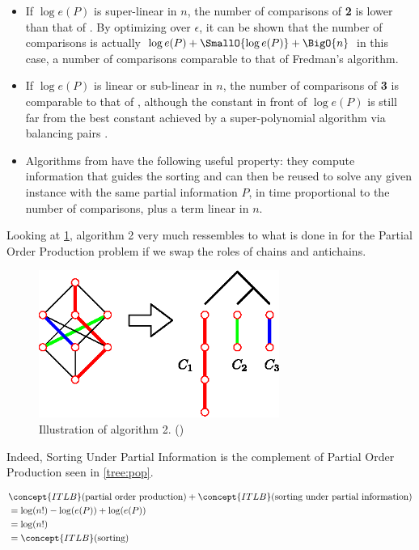 \begin{itemize}

\item If $\log e(P)$ is super-linear in $n$, the number of comparisons of \cite{cardinal2013sorting} \textbf{2} is lower than that of \cite{kahnkim1}. By optimizing over $\epsilon$, it can be shown that the number of comparisons is actually $\log e(P) + \SmallO{\log e(P)} + \BigO{n}$ in this case, a number of comparisons comparable to that of Fredman’s algorithm.

\item If $\log e(P)$ is linear or sub-linear in $n$, the number of comparisons of \cite{cardinal2013sorting} \textbf{3} is comparable to that of \cite{kahnkim1}, although the constant in front of $\log e(P)$ is still far from the best constant achieved by a super-polynomial algorithm via balancing pairs \cite{brightwell1995balancing, brightwell1999balanced}.

\item Algorithms from \cite{cardinal2013sorting} have the following useful property: they compute information that guides the sorting and can then be reused to solve any given instance with the same partial information $P$, in time proportional to the number of comparisons, plus a term linear in $n$.

\end{itemize}


Looking at \ref{fig:supi/alg2}, algorithm 2 very much ressembles to what is done in \cite{jcardin1} for the Partial Order Production problem if we swap the roles of chains and antichains.


\begin{figure}
	\centering
	\includegraphics[width=0.7\textwidth]{fig/supi/alg2}
	\caption{\label{fig:supi/alg2} Illustration of algorithm 2. (\cite{cardinal2013sorting})}
\end{figure}



Indeed, Sorting Under Partial Information is the complement of Partial Order Production seen in \ref{tree:pop}.

\begin{align*}
& \concept{ITLB}(\text{partial order production}) + \concept{ITLB}(\text{sorting under partial information}) \\
&= \log(n!) - \log(e(P)) + \log(e(P)) \\
&= \log(n!) \\
&= \concept{ITLB}(\text{sorting})
\label{eq:complementarity}
\end{align*}
